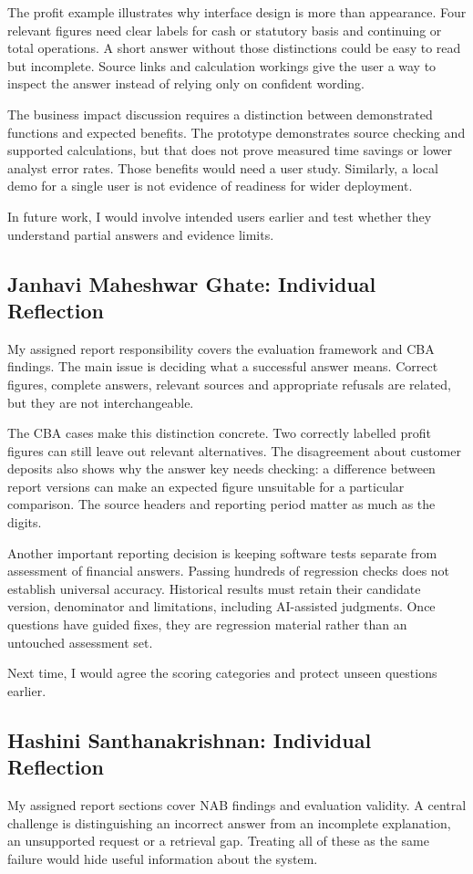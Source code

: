 The profit example illustrates why interface design is more than appearance. Four relevant figures need clear labels for cash or statutory basis and continuing or total operations. A short answer without those distinctions could be easy to read but incomplete. Source links and calculation workings give the user a way to inspect the answer instead of relying only on confident wording.

The business impact discussion requires a distinction between demonstrated functions and expected benefits. The prototype demonstrates source checking and supported calculations, but that does not prove measured time savings or lower analyst error rates. Those benefits would need a user study. Similarly, a local demo for a single user is not evidence of readiness for wider deployment.

In future work, I would involve intended users earlier and test whether they understand partial answers and evidence limits.

\subsection{Janhavi Maheshwar Ghate: Individual Reflection}
My assigned report responsibility covers the evaluation framework and CBA findings. The main issue is deciding what a successful answer means. Correct figures, complete answers, relevant sources and appropriate refusals are related, but they are not interchangeable.

The CBA cases make this distinction concrete. Two correctly labelled profit figures can still leave out relevant alternatives. The disagreement about customer deposits also shows why the answer key needs checking: a difference between report versions can make an expected figure unsuitable for a particular comparison. The source headers and reporting period matter as much as the digits.

Another important reporting decision is keeping software tests separate from assessment of financial answers. Passing hundreds of regression checks does not establish universal accuracy. Historical results must retain their candidate version, denominator and limitations, including AI-assisted judgments. Once questions have guided fixes, they are regression material rather than an untouched assessment set.

Next time, I would agree the scoring categories and protect unseen questions earlier.

\subsection{Hashini Santhanakrishnan: Individual Reflection}
My assigned report sections cover NAB findings and evaluation validity. A central challenge is distinguishing an incorrect answer from an incomplete explanation, an unsupported request or a retrieval gap. Treating all of these as the same failure would hide useful information about the system.

